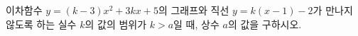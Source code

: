 이차함수 $y=(k-3)x^2+3kx+5$의 그래프와 직선 $y=k(x-1)-2$가 만나지 않도록 하는 실수 $k$의 값의 범위가 $k>a$일 때, 상수 $a$의 값을 구하시오.
